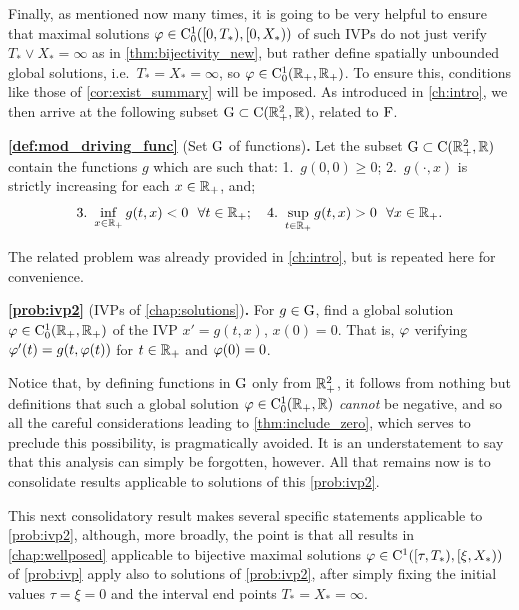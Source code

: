 Finally, as mentioned now many times, it is going to be very helpful to ensure that maximal solutions $\varphi\in\mathrm{C}^1_0([0,T_*),[0,X_*))$ of such IVPs do not just verify $T_*\vee X_*=\infty$ as in \autoref{thm:bijectivity_new}, but rather define spatially unbounded global solutions, i.e.~$T_*= X_*=\infty$, so $\varphi\in\mathrm{C}^1_0(\mathbb{R}_+,\mathbb{R}_+)$. To ensure this, conditions like those of \autoref{cor:exist_summary} will be imposed. As introduced in \autoref{ch:intro}, we then arrive at the following subset $\mathrm{G}\subset\mathrm{C}(\mathbb{R}_+^2,\mathbb{R})$, related to $\mathrm{F}$.

\textbf{\autoref{def:mod_driving_func}} (Set $\mathrm{G}$ of functions)\textbf{.}
    Let the subset $\mathrm{G}\subset\mathrm{C}(\mathbb{R}_+^2,\mathbb{R})$ contain the functions $g$ which are such that: 1.~$g(0,0)\ge0$; 2.~$g(\cdot,x)$ is strictly increasing for each $x\in\mathbb{R}_+$, and;
    \begin{equation}
        \text{3.~}\inf_{x\in\mathbb{R}_+}g(t,x)<0\ \ \forall t\in\mathbb{R}_+; \quad\text{4.~} \sup_{t\in\mathbb{R}_+}g(t,x)>0\ \ \forall x\in\mathbb{R}_+.
    \end{equation}

The related problem was already provided in \autoref{ch:intro}, but is repeated here for convenience.

\textbf{\autoref{prob:ivp2}} (IVPs of \autoref{chap:solutions})\textbf{.}
    For $g\in \mathrm{G}$, find a global solution $\varphi\in\mathrm{C}^1_0(\mathbb{R}_+,\mathbb{R}_+)$ of the IVP $x'=g(t,x)$, $x(0)=0$. That is, $\varphi$ verifying $\varphi'(t)=g(t,\varphi(t))$ for $t\in\mathbb{R}_+$ and $\varphi(0)=0$.

Notice that, by defining functions in $\mathrm{G}$ only from $\mathbb{R}_+^2$, it follows from nothing but definitions that such a global solution $\varphi\in\mathrm{C}^1_0(\mathbb{R}_+,\mathbb{R})$ \emph{cannot} be negative, and so all the careful considerations leading to \autoref{thm:include_zero}, which serves to preclude this possibility, is pragmatically avoided. It is an understatement to say that this analysis can simply be forgotten, however. All that remains now is to consolidate results applicable to solutions of this \autoref{prob:ivp2}.

This next consolidatory result makes several specific statements applicable to \autoref{prob:ivp2}, although, more broadly, the point is that all results in \autoref{chap:wellposed} applicable to bijective maximal solutions $\varphi\in\mathrm{C}^1([\tau,T_*),[\xi,X_*))$ of \autoref{prob:ivp} apply also to solutions of \autoref{prob:ivp2}, after simply fixing the initial values $\tau=\xi=0$ and the interval end points $T_*=X_*=\infty$.

